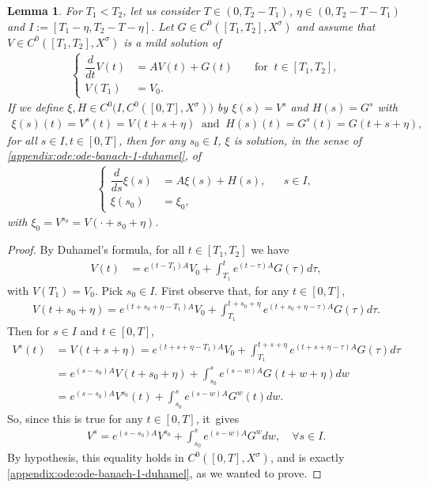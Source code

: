 \documentclass[10pt]{amsart}
\newtheorem{lemma}[theorem]{Lemma}
\theoremstyle{definition}
\begin{document}
\begin{lemma}\label{lmtranslat}
For $T_1<T_2$, let us consider $T\in (0, T_2-T_1)$, $\eta\in (0, T_2-T-T_1)$ and $I:=[T_1-\eta, T_2-T-\eta]$. Let $G\in C^{0}([T_{1},T_{2}],X^{\sigma})$ and assume that $V\in C^{0}([T_{1},T_{2}],X^{\sigma})$ is a mild solution of
\begin{align*}
\left\{\begin{aligned}
\dfrac{d}{dt}V(t)&=A V(t)+G(t) &&\text{ for }\ t\in [T_1, T_2],\\
V(T_1)&=V_0. &
\end{aligned}\right.
\end{align*}
If we define $\xi,H\in C^{0}\bigl(I, C^{0}([0,T],X^{\sigma})\bigr)$ by $\xi(s)=V^s$ and $H(s)=G^s$ with
\begin{align*}
\xi(s)(t)=V^{s}(t)=V(t+s+\eta)\ \text{ and }\ H(s)(t)=G^{s}(t)=G(t+s+\eta),
\end{align*}
for all $s\in I, t\in [0,T]$, then for any $s_0\in I$, $\xi$ is solution, in the sense of \eqref{appendix:ode:ode-banach-1-duhamel}, of
\begin{align*}
\left\{\begin{aligned}
\dfrac{d}{ds}\xi(s)&=A \xi(s)+H(s), && s\in I, \\
\xi(s_0)&=\xi_0, &
\end{aligned}\right.
\end{align*}
with $\xi_0=V^{s_0}=V(\cdot+s_0+\eta)$.
\end{lemma}
\begin{proof}
By Duhamel's formula, for all $t\in [T_1, T_2]$ we have
\begin{align*}
V(t)&=e^{(t-T_1)A}V_{0}+\int_{T_1}^{t}e^{(t-\tau)A}G(\tau)d\tau,
\end{align*}
with $V(T_1)=V_0$. Pick $s_0\in I$. First observe that, for any $t\in [0, T]$,
\begin{align*}
V(t+s_0+\eta)=e^{(t+s_0+\eta-T_1)A}V_{0}+\int_{T_1}^{t+s_0+\eta}e^{(t+s_0+\eta-\tau)A}G(\tau)d\tau.
\end{align*}
Then for $s\in I$ and $t\in [0, T]$,
\begin{align*}
V^{s}(t)&=V(t+s+\eta)=e^{(t+s+\eta-T_1)A}V_{0}+\int_{T_1}^{t+s+\eta}e^{(t+s+\eta-\tau)A}G(\tau)d\tau\\
&=e^{(s-s_0)A}V(t+s_0+\eta)+\int_{s_0}^{s}e^{(s-w)A}G(t+w+\eta)dw\\
&=e^{(s-s_0)A}V^{s_0}(t)+\int_{s_0}^{s}e^{(s-w)A}G^{w}(t)dw.
\end{align*}
So, since this is true for any $t\in [0,T]$, it~gives
\begin{align*}
V^{s}=e^{(s-s_0)A}V^{s_0}+\int_{s_0}^{s}e^{(s-w)A}G^{w}dw,\quad \forall s\in I.
\end{align*}
By hypothesis, this equality holds in $C^0([0, T], X^\sigma)$, and is exactly \eqref{appendix:ode:ode-banach-1-duhamel}, as we wanted to prove.
\end{proof}
\end{document}
